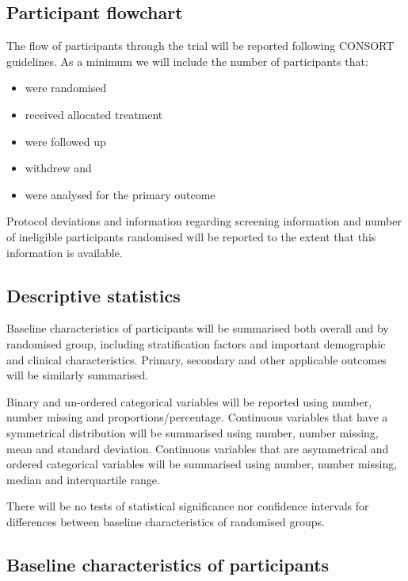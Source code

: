 \documentclass[a4paper]{article}
\begin{document}
\subsection{Participant flowchart}

The flow of participants through the trial will be reported following CONSORT guidelines.
As a minimum we will include the number of participants that: 

\begin{itemize}
    \item were randomised
    \item received allocated treatment
    \item were followed up
    \item withdrew and 
    \item were analysed for the primary outcome
\end{itemize}

Protocol deviations and information regarding screening information and number of ineligible participants randomised will be reported to the extent that this information is available.

\subsection{Descriptive statistics}

Baseline characteristics of participants will be summarised both overall and by randomised group, including stratification factors and important demographic and clinical characteristics.
Primary, secondary and other applicable outcomes will be similarly summarised.

Binary and un-ordered categorical variables will be reported using number, number missing and proportions/percentage.
Continuous variables that have a symmetrical distribution will be summarised using number, number missing, mean and standard deviation.
Continuous variables that are asymmetrical and ordered categorical variables will be summarised using number, number missing, median and interquartile range.

There will be no tests of statistical significance nor confidence intervals for differences between baseline characteristics of randomised groups.

\subsection{Baseline characteristics of participants}
\end{document}
